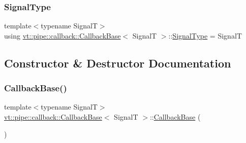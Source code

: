 \mbox{\label{structvt_1_1pipe_1_1callback_1_1_callback_base_ae1d258fb58ce12e88ae0c16bf66e5e60}} 
\subsubsection{\texorpdfstring{Signal\+Type}{SignalType}}
{\footnotesize\ttfamily template$<$typename SignalT$>$ \\
using \hyperlink{structvt_1_1pipe_1_1callback_1_1_callback_base}{vt\+::pipe\+::callback\+::\+Callback\+Base}$<$ SignalT $>$\+::\hyperlink{structvt_1_1pipe_1_1callback_1_1_callback_base_ae1d258fb58ce12e88ae0c16bf66e5e60}{Signal\+Type} =  SignalT}



\subsection{Constructor \& Destructor Documentation}
\mbox{\label{structvt_1_1pipe_1_1callback_1_1_callback_base_aed02135f19f5d5ca4899d488ce402b64}} 
\subsubsection{\texorpdfstring{Callback\+Base()}{CallbackBase()}\hspace{0.1cm}{\footnotesize\ttfamily [1/7]}}
{\footnotesize\ttfamily template$<$typename SignalT$>$ \\
\hyperlink{structvt_1_1pipe_1_1callback_1_1_callback_base}{vt\+::pipe\+::callback\+::\+Callback\+Base}$<$ SignalT $>$\+::\hyperlink{structvt_1_1pipe_1_1callback_1_1_callback_base}{Callback\+Base} (\begin{DoxyParamCaption}\item[{\hyperlink{structvt_1_1pipe_1_1callback_1_1_callback_base}{Callback\+Base}$<$ SignalT $>$ const \&}]{ }\end{DoxyParamCaption})\hspace{0.3cm}{\ttfamily [default]}}

